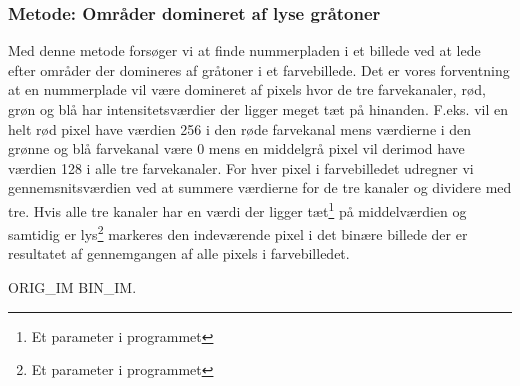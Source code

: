 \subsubsection*{Metode: Områder domineret af lyse gråtoner}
Med denne metode forsøger vi at finde nummerpladen i et billede ved at lede efter områder der domineres af gråtoner i et farvebillede. Det er vores forventning at en nummerplade vil være domineret af pixels hvor de tre farvekanaler, rød, grøn og blå har intensitetsværdier der ligger meget tæt på hinanden. F.eks. vil en helt rød pixel have værdien 256 i den røde farvekanal mens værdierne i den grønne og blå farvekanal være 0 mens en middelgrå pixel vil derimod have værdien 128 i alle tre farvekanaler. For hver pixel i farvebilledet udregner vi gennemsnitsværdien ved at summere værdierne for de tre kanaler og dividere med tre. Hvis alle tre kanaler har en værdi der ligger tæt\footnote{Et parameter i programmet} på middelværdien og samtidig er lys\footnote{Et parameter i programmet} markeres den indeværende pixel i det binære billede der er resultatet af gennemgangen af alle pixels i farvebilledet.

ORIG\_IM BIN\_IM.
 


